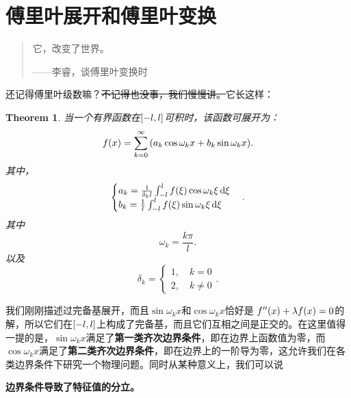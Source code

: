 \documentclass[12pt,a4paper,openany,twoside]{book}
\newtheorem{theorem}{Theorem}[section]
\numberwithin{equation}{section}
\begin{document}
      \section{傅里叶展开和傅里叶变换}
        \label{fourier_transformation}
        \begin{quote}
          它，改变了世界。
          \begin{flushright}
            ——李睿，谈傅里叶变换时
          \end{flushright}
        \end{quote}     
        还记得傅里叶级数嘛？\sout{不记得也没事，我们慢慢讲。}它长这样：
        \begin{theorem}
          当一个有界函数在$\qty[-l,l]$可积时，该函数可展开为：
          \begin{equation}
            \label{real_fourier_series}
            f\qty(x)=\sum_{k=0}^{\infty}\qty(a_k\cos{\omega_k x}+b_k\sin{\omega_k x}).
          \end{equation}
          其中，
          \begin{equation} 
            \begin{cases}
              a_k=\frac{1}{\delta_k l}\int_{-l}^l{f\qty(\xi)\cos{\omega_k\xi}\dd{\xi}}\\
              b_k=\frac{1}{l}\int_{-l}^l{f\qty(\xi)\sin{\omega_k\xi}\dd{\xi}}
            \end{cases}
            .
          \end{equation}
          其中
          \begin{equation}
            \omega_k=\frac{k\pi}{l}.
          \end{equation}
          以及
          \begin{equation}
            \delta_k=
            \begin{cases}
              1,\quad k=0 \\
              2,\quad k\neq0 
            \end{cases}
            .
          \end{equation}
        \end{theorem}

        {}

        我们刚刚描述过完备基展开，而且$\sin{\omega_k x}$和$\cos{\omega_k x}$恰好是 $f''\qty(x) + \lambda f\qty(x) = 0$的解，所以它们在$\qty[-l,l]$上构成了完备基，而且它们互相之间是正交的。在这里值得一提的是，$\sin{\omega_k x}$满足了\textbf{第一类齐次边界条件}，即在边界上函数值为零，而$\cos{\omega_k x}$满足了\textbf{第二类齐次边界条件}，即在边界上的一阶导为零，这允许我们在各类边界条件下研究一个物理问题。同时从某种意义上，我们可以说
        \begin{center}
          \textbf{边界条件导致了特征值的分立。}
        \end{center}
\end{document}

